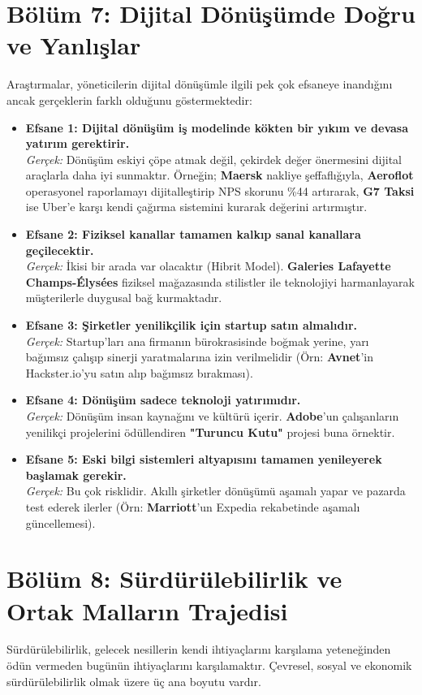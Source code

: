 \documentclass[11pt,a4paper,openany]{book}
\begin{document}
\needspace{9cm}
\section{Bölüm 7: Dijital Dönüşümde Doğru ve Yanlışlar}
Araştırmalar, yöneticilerin dijital dönüşümle ilgili pek çok efsaneye inandığını ancak gerçeklerin farklı olduğunu göstermektedir:
\begin{itemize}
    \item \textbf{Efsane 1: Dijital dönüşüm iş modelinde kökten bir yıkım ve devasa yatırım gerektirir.}
        \\ \textit{Gerçek:} Dönüşüm eskiyi çöpe atmak değil, çekirdek değer önermesini dijital araçlarla daha iyi sunmaktır. Örneğin; \textbf{Maersk} nakliye şeffaflığıyla, \textbf{Aeroflot} operasyonel raporlamayı dijitalleştirip NPS skorunu \%44 artırarak, \textbf{G7 Taksi} ise Uber'e karşı kendi çağırma sistemini kurarak değerini artırmıştır.
    \item \textbf{Efsane 2: Fiziksel kanallar tamamen kalkıp sanal kanallara geçilecektir.}
        \\ \textit{Gerçek:} İkisi bir arada var olacaktır (Hibrit Model). \textbf{Galeries Lafayette Champs-Élysées} fiziksel mağazasında stilistler ile teknolojiyi harmanlayarak müşterilerle duygusal bağ kurmaktadır.
    \item \textbf{Efsane 3: Şirketler yenilikçilik için startup satın almalıdır.}
        \\ \textit{Gerçek:} Startup'ları ana firmanın bürokrasisinde boğmak yerine, yarı bağımsız çalışıp sinerji yaratmalarına izin verilmelidir (Örn: \textbf{Avnet}'in Hackster.io'yu satın alıp bağımsız bırakması).
    \item \textbf{Efsane 4: Dönüşüm sadece teknoloji yatırımıdır.}
        \\ \textit{Gerçek:} Dönüşüm insan kaynağını ve kültürü içerir. \textbf{Adobe}'un çalışanların yenilikçi projelerini ödüllendiren \textbf{"Turuncu Kutu"} projesi buna örnektir.
    \item \textbf{Efsane 5: Eski bilgi sistemleri altyapısını tamamen yenileyerek başlamak gerekir.}
        \\ \textit{Gerçek:} Bu çok risklidir. Akıllı şirketler dönüşümü aşamalı yapar ve pazarda test ederek ilerler (Örn: \textbf{Marriott}'un Expedia rekabetinde aşamalı güncellemesi).
\end{itemize}

\needspace{9cm}
\section{Bölüm 8: Sürdürülebilirlik ve Ortak Malların Trajedisi}
Sürdürülebilirlik, gelecek nesillerin kendi ihtiyaçlarını karşılama yeteneğinden ödün vermeden bugünün ihtiyaçlarını karşılamaktır. Çevresel, sosyal ve ekonomik sürdürülebilirlik olmak üzere üç ana boyutu vardır.
\end{document}

